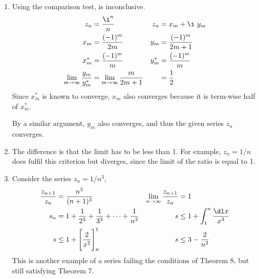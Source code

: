 \begin{enumerate}
    \item Using the comparison test, is inconclusive.
          \begin{align}
              z_n                                   & = \frac{\i^n}{n}          &
              z_n                                   & = x_m + \i\ y_m             \\
              x_m                                   & = \frac{(-1)^m}{2m}       &
              y_m                                   & = \frac{(-1)^{m}}{2m + 1}   \\
              x_m^*                                 & = \frac{(-1)^m}{m}        &
              y_m^*                                 & = \frac{(-1)^{m}}{m}        \\
              \lim_{m \to \infty} \frac{y_m}{y_m^*} & = \lim_{m \to \infty}
              \frac{m}{2m+1}                        &
                                                    & = \frac{1}{2}
          \end{align}
          Since $ x^*_m $ is known to converge, $ x_m $ also converges because it is
          term-wise half of $ x^*_m $. \par
          By a similar argument, $ y_m $ also converges, and thus the given series
          $ z_n $ \textcolor{y_h}{converges}.

    \item The difference is that the limit has to be less than 1. For example,
          $ z_n = 1/n $ does fulfil this criterion but diverges, since the limit of
          the ratio is equal to 1.

    \item Consider the series $ z_n = 1/n^3 $,
          \begin{align}
              \frac{z_{n+1}}{z_n}                     & = \frac{n^3}{(n+1)^3}  &
              \lim_{n \to \infty} \frac{z_{n+1}}{z_n} & = 1                      \\
              s_n                                     & = 1 + \frac{1}{2^3}
              + \frac{1}{3^3} + \dots + \frac{1}{n^3} &
              s                                       & \leq 1 + \int_{1}^{n}
              \frac{\dl x}{x^3}                                                  \\
              s                                       & \leq 1 + \Bigg[
              \frac{2}{x^2} \Bigg]_n^1                &
              s                                       & \leq 3 - \frac{2}{n^2}
          \end{align}
          This is another example of a series failing the conditions of Theorem 8, but
          still satisfying Theorem 7.


\end{enumerate}
